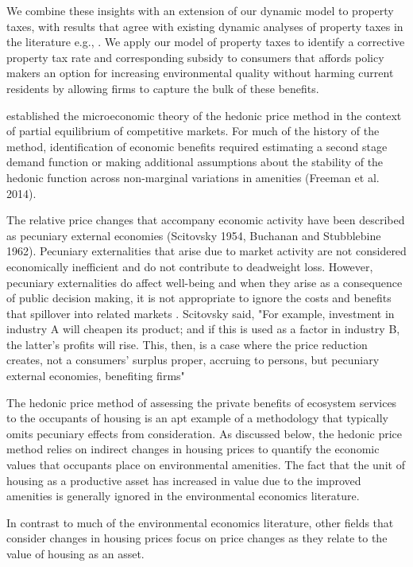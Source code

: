 \documentclass[ecta,nameyear,draft]{econsocart}
\theoremstyle{plain}
\theoremstyle{remark}
\begin{document}
We combine these insights with an extension of our dynamic model to property taxes, with results that agree with existing dynamic analyses of property taxes in the literature e.g., \cite{rosen80}. We apply our model of property taxes to identify a corrective property tax rate and corresponding subsidy to consumers that affords policy makers an option for increasing environmental quality without harming current residents by allowing firms to capture the bulk of these benefits.




\cite{rosen74} established the microeconomic theory of the hedonic price method in the context of partial equilibrium of competitive markets. For much of the history of the method, identification of economic benefits required estimating a second stage demand function or making additional assumptions about the stability of the hedonic function across non-marginal variations in amenities (Freeman et al. 2014).  

The relative price changes that accompany economic activity have been described as pecuniary external economies (Scitovsky 1954, Buchanan and Stubblebine 1962). Pecuniary externalities that arise due to market activity are not considered economically inefficient and do not contribute to deadweight loss. However, pecuniary externalities do affect well-being and when they arise as a consequence of public decision making, it is not appropriate to ignore the costs and benefits that spillover into related markets . Scitovsky said, "For example, investment in industry A will cheapen its product; and if this is used as a factor in industry B, the latter's
profits will rise. This, then, is a case
where the price reduction creates, not a
consumers' surplus proper, accruing to
persons, but pecuniary external economies, benefiting firms"

The hedonic price method of assessing the private benefits of ecosystem services to the occupants of housing is an apt example of a methodology that typically omits pecuniary effects from consideration. As discussed below, the hedonic price method relies on indirect changes in housing prices to quantify the economic values that occupants place on environmental amenities. The fact that the unit of housing as a productive asset has increased in value due to the improved amenities is generally ignored in the environmental economics literature. 

In contrast to much of the environmental economics literature, other fields that consider changes in housing prices focus on price changes as they relate to the value of housing as an asset.  
\end{document}
